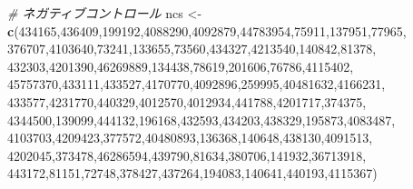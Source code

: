 \documentclass[
  11pt]{book}
\newenvironment{Shaded}{\begin{snugshade}}{\end{snugshade}}
\newcommand{\CommentTok}[1]{\textcolor[rgb]{0.56,0.35,0.01}{\textit{#1}}}
\newcommand{\DecValTok}[1]{\textcolor[rgb]{0.00,0.00,0.81}{#1}}
\newcommand{\FunctionTok}[1]{\textcolor[rgb]{0.13,0.29,0.53}{\textbf{#1}}}
\newcommand{\NormalTok}[1]{#1}
\newcommand{\OtherTok}[1]{\textcolor[rgb]{0.56,0.35,0.01}{#1}}
\theoremstyle{definition}
\theoremstyle{definition}
\theoremstyle{definition}
\theoremstyle{definition}
\theoremstyle{remark}
\begin{document}
\begin{Shaded}
\begin{Highlighting}[]
\CommentTok{\# ネガティブコントロール}
\NormalTok{ncs }\OtherTok{\textless{}{-}} \FunctionTok{c}\NormalTok{(}\DecValTok{434165}\NormalTok{,}\DecValTok{436409}\NormalTok{,}\DecValTok{199192}\NormalTok{,}\DecValTok{4088290}\NormalTok{,}\DecValTok{4092879}\NormalTok{,}\DecValTok{44783954}\NormalTok{,}\DecValTok{75911}\NormalTok{,}\DecValTok{137951}\NormalTok{,}\DecValTok{77965}\NormalTok{,}
         \DecValTok{376707}\NormalTok{,}\DecValTok{4103640}\NormalTok{,}\DecValTok{73241}\NormalTok{,}\DecValTok{133655}\NormalTok{,}\DecValTok{73560}\NormalTok{,}\DecValTok{434327}\NormalTok{,}\DecValTok{4213540}\NormalTok{,}\DecValTok{140842}\NormalTok{,}\DecValTok{81378}\NormalTok{,}
         \DecValTok{432303}\NormalTok{,}\DecValTok{4201390}\NormalTok{,}\DecValTok{46269889}\NormalTok{,}\DecValTok{134438}\NormalTok{,}\DecValTok{78619}\NormalTok{,}\DecValTok{201606}\NormalTok{,}\DecValTok{76786}\NormalTok{,}\DecValTok{4115402}\NormalTok{,}
         \DecValTok{45757370}\NormalTok{,}\DecValTok{433111}\NormalTok{,}\DecValTok{433527}\NormalTok{,}\DecValTok{4170770}\NormalTok{,}\DecValTok{4092896}\NormalTok{,}\DecValTok{259995}\NormalTok{,}\DecValTok{40481632}\NormalTok{,}\DecValTok{4166231}\NormalTok{,}
         \DecValTok{433577}\NormalTok{,}\DecValTok{4231770}\NormalTok{,}\DecValTok{440329}\NormalTok{,}\DecValTok{4012570}\NormalTok{,}\DecValTok{4012934}\NormalTok{,}\DecValTok{441788}\NormalTok{,}\DecValTok{4201717}\NormalTok{,}\DecValTok{374375}\NormalTok{,}
         \DecValTok{4344500}\NormalTok{,}\DecValTok{139099}\NormalTok{,}\DecValTok{444132}\NormalTok{,}\DecValTok{196168}\NormalTok{,}\DecValTok{432593}\NormalTok{,}\DecValTok{434203}\NormalTok{,}\DecValTok{438329}\NormalTok{,}\DecValTok{195873}\NormalTok{,}\DecValTok{4083487}\NormalTok{,}
         \DecValTok{4103703}\NormalTok{,}\DecValTok{4209423}\NormalTok{,}\DecValTok{377572}\NormalTok{,}\DecValTok{40480893}\NormalTok{,}\DecValTok{136368}\NormalTok{,}\DecValTok{140648}\NormalTok{,}\DecValTok{438130}\NormalTok{,}\DecValTok{4091513}\NormalTok{,}
         \DecValTok{4202045}\NormalTok{,}\DecValTok{373478}\NormalTok{,}\DecValTok{46286594}\NormalTok{,}\DecValTok{439790}\NormalTok{,}\DecValTok{81634}\NormalTok{,}\DecValTok{380706}\NormalTok{,}\DecValTok{141932}\NormalTok{,}\DecValTok{36713918}\NormalTok{,}
         \DecValTok{443172}\NormalTok{,}\DecValTok{81151}\NormalTok{,}\DecValTok{72748}\NormalTok{,}\DecValTok{378427}\NormalTok{,}\DecValTok{437264}\NormalTok{,}\DecValTok{194083}\NormalTok{,}\DecValTok{140641}\NormalTok{,}\DecValTok{440193}\NormalTok{,}\DecValTok{4115367}\NormalTok{)}


\end{Highlighting}
\end{Shaded}
\end{document}
